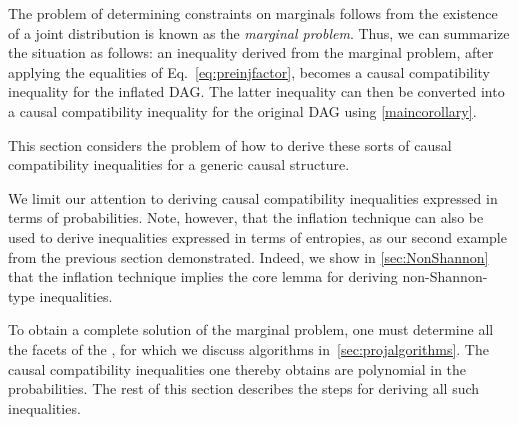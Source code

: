 The problem of determining constraints on marginals follows from the existence of a joint distribution is known as the {\em marginal problem}.   Thus, we can summarize the situation as follows: an inequality derived from the marginal problem, after applying the equalities of Eq.~\eqref{eq:preinjfactor}, becomes a causal compatibility inequality for the inflated DAG. The latter inequality can then be converted into a causal compatibility inequality for the original DAG using \cref{maincorollary}.




This section considers the problem of how to derive these sorts of causal compatibility inequalities for a generic causal structure. 




We limit our attention to deriving causal compatibility inequalities expressed in terms of probabilities.  Note, however, that the inflation technique can also be used to derive inequalities expressed in terms of entropies, as our second example from the previous section demonstrated.
Indeed, we show in \cref{sec:NonShannon} that the inflation technique implies the core lemma for deriving non-Shannon-type inequalities.


To obtain a complete solution of the marginal problem, one must determine all the facets of the , for which we discuss algorithms in~\cref{sec:projalgorithms}. The causal compatibility inequalities one thereby obtains are polynomial in the probabilities.  The rest of this section describes the steps for deriving all such inequalities.  

